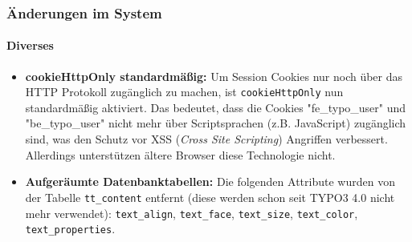 \begin{frame}[fragile]
	\frametitle{Änderungen im System}
	\framesubtitle{Diverses}

	\begin{itemize}

		\item \textbf{cookieHttpOnly standardmäßig:}\newline
			\small
				Um Session Cookies nur noch über das HTTP Protokoll zugänglich zu machen, ist \texttt{cookieHttpOnly} nun standardmäßig aktiviert.\newline
				Das bedeutet, dass die Cookies "fe\_typo\_user" und "be\_typo\_user" nicht mehr über Scriptsprachen (z.B. JavaScript) zugänglich sind, was den Schutz vor XSS (\textit{Cross Site Scripting}) Angriffen verbessert. Allerdings unterstützen ältere Browser diese Technologie nicht.
			\normalsize

		\item \textbf{Aufgeräumte Datenbanktabellen:}\newline
			\small
				Die folgenden Attribute wurden von der Tabelle \texttt{tt\_content} entfernt (diese werden schon seit TYPO3 4.0 nicht mehr verwendet):
				\texttt{text\_align}, \texttt{text\_face}, \texttt{text\_size}, \texttt{text\_color}, \texttt{text\_properties}.
			\normalsize

	\end{itemize}
	
\end{frame}


